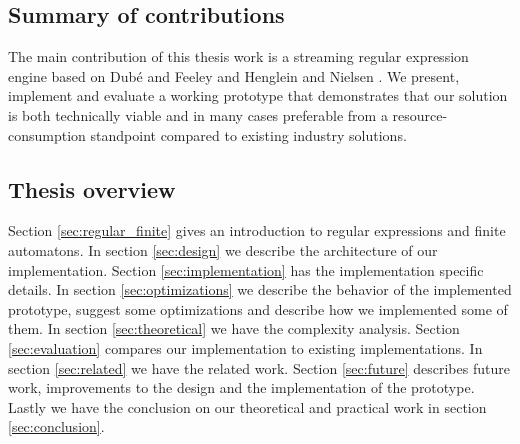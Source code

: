 \subsection{Summary of contributions}

The main contribution of this thesis work is a streaming regular
expression engine based on Dub\'{e} and Feeley \cite{Dube2000} and
Henglein and Nielsen \cite{Henglein2010}. We present, implement and
evaluate a working prototype that demonstrates that our solution is
both technically viable and in many cases preferable from a
resource-consumption standpoint compared to existing industry
solutions.

\subsection{Thesis overview}

Section \ref{sec:regular_finite} gives an introduction to regular
expressions and finite automatons. In section \ref{sec:design} we
describe the architecture of our implementation. Section
\ref{sec:implementation} has the implementation specific details. In
section \ref{sec:optimizations} we describe the behavior of the
implemented prototype, suggest some optimizations and describe how we
implemented some of them. In section \ref{sec:theoretical} we have the
complexity analysis. Section \ref{sec:evaluation} compares our
implementation to existing implementations. In section
\ref{sec:related} we have the related work. Section \ref{sec:future}
describes future work, improvements to the design and the
implementation of the prototype. Lastly we have the conclusion on our
theoretical and practical work in section \ref{sec:conclusion}.
